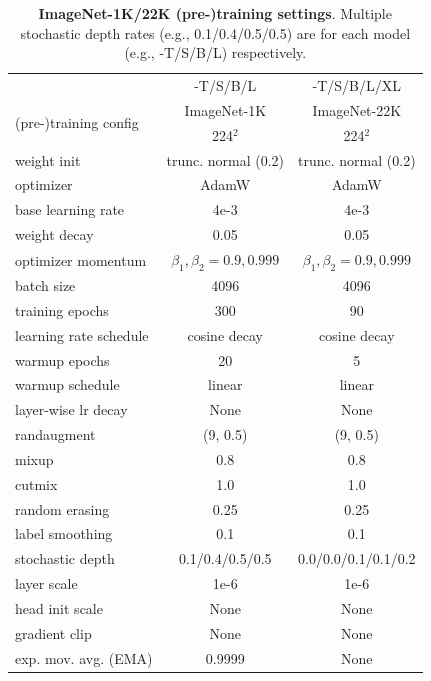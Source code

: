 \documentclass[10pt,twocolumn,letterpaper]{article}
\newcommand{\tablestyle}[2]{\setlength{\tabcolsep}{#1}\renewcommand{\arraystretch}{#2}\centering\footnotesize}
\begin{document}
\begin{table}[h]
\tablestyle{5.0pt}{1.02}
\footnotesize
\begin{tabular}{@{\hskip -0.05ex}l|c@{\hskip 1ex}c}
& \cnn{}-T/S/B/L & \cnn{}-T/S/B/L/XL \\
\multirow{2}{*}{(pre-)training config} & ImageNet-1K & ImageNet-22K \\
& 224$^2$ & 224$^2$ \\
\shline
weight init & trunc. normal (0.2) & trunc. normal (0.2) \\
optimizer & AdamW & AdamW\\
base learning rate & 4e-3 & 4e-3 \\
weight decay & 0.05 & 0.05 \\
optimizer momentum & $\beta_1, \beta_2{=}0.9, 0.999$ & $\beta_1, \beta_2{=}0.9, 0.999$ \\
batch size & 4096 & 4096 \\
training epochs & 300 & 90 \\
learning rate schedule & cosine decay & cosine decay \\
warmup epochs & 20 & 5 \\
warmup schedule & linear & linear \\
layer-wise lr decay \cite{Clark2020,Bao2021} & None & None \\
randaugment \cite{Cubuk2020} & (9, 0.5) & (9, 0.5) \\
mixup \cite{Zhang2018a} & 0.8 & 0.8 \\
cutmix \cite{Yun2019} & 1.0 & 1.0 \\
random erasing \cite{Zhong2020} & 0.25 & 0.25 \\
label smoothing \cite{Szegedy2016a} & 0.1 & 0.1 \\
stochastic depth \cite{Huang2016deep} & 0.1/0.4/0.5/0.5 & 0.0/0.0/0.1/0.1/0.2 \\
layer scale \cite{Touvron2021GoingDW} & 1e-6 & 1e-6 \\
head init scale \cite{Touvron2021GoingDW} & None & None \\
gradient clip & None & None \\
exp. mov. avg. (EMA) \cite{Polyak1992} & 0.9999 & None\\

\end{tabular}
\caption{\textbf{ImageNet-1K/22K (pre-)training settings}. Multiple stochastic depth rates (e.g., 0.1/0.4/0.5/0.5) are for each model (e.g., \cnn{}-T/S/B/L) respectively.}
\label{tab:train_detail}
\end{table}
\end{document}
